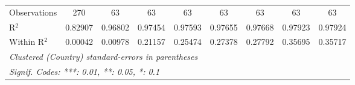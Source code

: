 \begin{table}[htbp]
\begin{tabular}{lcccccccc}
      Observations                                                            & 270      & 63       & 63              & 63              & 63              & 63              & 63              & 63\\  
      R$^2$                                                                   & 0.82907  & 0.96802  & 0.97454         & 0.97593         & 0.97655         & 0.97668         & 0.97923         & 0.97924\\  
      Within R$^2$                                                            & 0.00042  & 0.00978  & 0.21157         & 0.25474         & 0.27378         & 0.27792         & 0.35695         & 0.35717\\  
      \midrule \midrule
      \multicolumn{9}{l}{\emph{Clustered (Country) standard-errors in parentheses}}\\
      \multicolumn{9}{l}{\emph{Signif. Codes: ***: 0.01, **: 0.05, *: 0.1}}\\
   \end{tabular}
\end{table}


